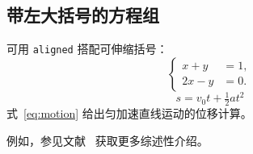 \subsection{带左大括号的方程组}
可用 \verb|aligned| 搭配可伸缩括号：
\begin{equation}
  \left\{ \begin{aligned}
    x + y &= 1, \\
    2x - y &= 0.
  \end{aligned} \right.
\end{equation}
\begin{equation}\label{eq:motion}
  s = v_0 t + \tfrac{1}{2} a t^2
\end{equation}
式~\eqref{eq:motion} 给出匀加速直线运动的位移计算。

例如，参见文献~\cite{alorf_survey_2023} 获取更多综述性介绍。
